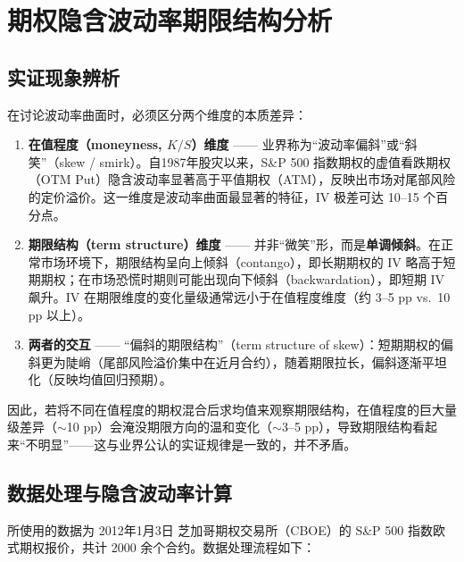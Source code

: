 
\section{期权隐含波动率期限结构分析}

\subsection{实证现象辨析}

在讨论波动率曲面时，必须区分两个维度的本质差异：

\begin{enumerate}[leftmargin=*]
    \item \textbf{在值程度（moneyness, $K/S$）维度} —— 业界称为“波动率偏斜”或“斜笑”（skew / smirk）。自1987年股灾以来，S\&P 500 指数期权的虚值看跌期权（OTM Put）隐含波动率显著高于平值期权（ATM），反映出市场对尾部风险的定价溢价。这一维度是波动率曲面最显著的特征，IV 极差可达 10--15 个百分点。
    \item \textbf{期限结构（term structure）维度} —— 并非“微笑”形，而是\textbf{单调倾斜}。在正常市场环境下，期限结构呈向上倾斜（contango），即长期期权的 IV 略高于短期期权；在市场恐慌时期则可能出现向下倾斜（backwardation），即短期 IV 飙升。IV 在期限维度的变化量级通常远小于在值程度维度（约 3--5 pp vs.\ 10 pp 以上）。
    \item \textbf{两者的交互} —— “偏斜的期限结构”（term structure of skew）：短期期权的偏斜更为陡峭（尾部风险溢价集中在近月合约），随着期限拉长，偏斜逐渐平坦化（反映均值回归预期）。
\end{enumerate}

因此，若将不同在值程度的期权混合后求均值来观察期限结构，在值程度的巨大量级差异（$\sim$10 pp）会淹没期限方向的温和变化（$\sim$3--5 pp），导致期限结构看起来“不明显”——这与业界公认的实证规律是一致的，并不矛盾。

\subsection{数据处理与隐含波动率计算}

所使用的数据为 2012年1月3日 芝加哥期权交易所（CBOE）的 S\&P 500 指数欧式期权报价，共计 2000 余个合约。数据处理流程如下：

